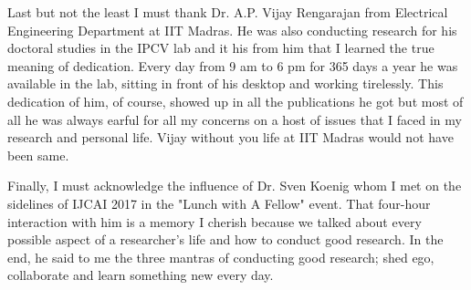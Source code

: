 Last but not the least I must thank Dr. A.P. Vijay Rengarajan from Electrical Engineering Department at IIT Madras. He was also conducting research for his doctoral studies in the IPCV lab and it his from him that I learned the true meaning of dedication. Every day from 9 am to 6 pm for 365 days a year he was available in the lab, sitting in front of his desktop and working tirelessly. This dedication of him, of course, showed up in all the publications he got but most of all he was always earful for all my concerns on a host of issues that I faced in my research and personal life. Vijay without you life at IIT Madras would not have been same.

Finally, I must acknowledge the influence of Dr. Sven Koenig whom I met on the sidelines of IJCAI 2017 in the "Lunch with  A Fellow" event. That four-hour interaction with him is a memory I cherish because we talked about every possible aspect of a researcher's life and how to conduct good research. In the end, he said to me the three mantras of conducting good research; shed ego, collaborate and learn something new every day.

